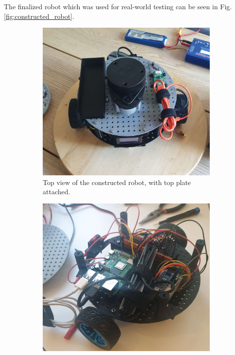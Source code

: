 The finalized robot which was used for real-world testing can be seen in Fig.\:\ref{fig:constructed_robot}.
\begin{figure}
    \centering
    \begin{subfigure}[t]{0.32\columnwidth}
        \centering
        \includegraphics[width=\textwidth]{images/real_robot_top_plate.jpg}
        \caption{Top view of the constructed robot, with top plate attached.}
        \label{fig:constructed_robot_top_plate}
    \end{subfigure}
    \hfill
	\begin{subfigure}[t]{0.32\columnwidth}
		\centering
		\includegraphics[width=\textwidth]{images/real_robot_top.jpg}

\end{subfigure}
\end{figure}
